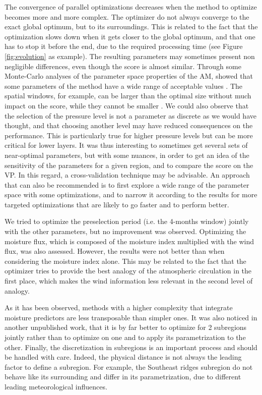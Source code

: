 \documentclass[5p]{elsarticle}
\begin{document}
The convergence of parallel optimizations decreases when the method to optimize becomes more and more complex. The optimizer do not always converge to the exact global optimum, but to its surroundings. This is related to the fact that the optimization slows down when it gets closer to the global optimum, and that one has to stop it before the end, due to the required processing time (see Figure \ref{fig:evolution} as example). The resulting parameters may sometimes present non negligible differences, even though the score is almost similar. Through some Monte-Carlo analyses of the parameter space properties of the AM, \citet{Horton2012a} showed that some parameters of the method have a wide range of acceptable values \citep[see also][]{Horton2016}. The spatial windows, for example, can be larger than the optimal size without much impact on the score, while they cannot be smaller \citep[see also][]{Bontron2004}. We could also observe that the selection of the pressure level is not a parameter as discrete as we would have thought, and that choosing another level may have reduced consequences on the performance. This is particularly true for higher pressure levels but can be more critical for lower layers. It was thus interesting to sometimes get several sets of near-optimal parameters, but with some nuances, in order to get an idea of the sensitivity of the parameters for a given region, and to compare the score on the VP. In this regard, a cross-validation technique may be advisable. An approach that can also be recommended is to first explore a wide range of the parameter space with some optimizations, and to narrow it according to the results for more targeted optimizations that are likely to go faster and to perform better.

We tried to optimize the preselection period (i.e. the 4-months window) jointly with the other parameters, but no improvement was observed. Optimizing the moisture flux, which is composed of the moisture index multiplied with the wind flux, was also assessed. However, the results were not better than when considering the moisture index alone. This may be related to the fact that the optimizer tries to provide the best analogy of the atmospheric circulation in the first place, which makes the wind information less relevant in the second level of analogy.

As it has been observed, methods with a higher complexity that integrate moisture predictors are less transposable than simpler ones. It was also noticed in another unpublished work, that it is by far better to optimize for 2 subregions jointly rather than to optimize on one and to apply its parametrization to the other. Finally, the discretization in subregions is an important process and should be handled with care. Indeed, the physical distance is not always the leading factor to define a subregion. For example, the Southeast ridges subregion do not behave like its surrounding and differ in its parametrization, due to different leading meteorological influences.
\end{document}

